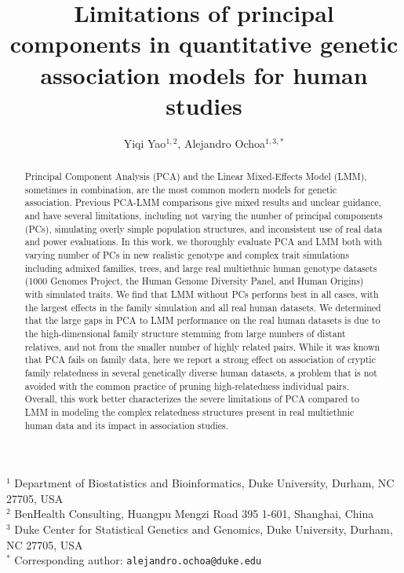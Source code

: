 \documentclass[11pt]{article}
\title{\Large \textbf{
    Limitations of principal components in quantitative genetic association models for human studies
  }}
\author{Yiqi Yao$^{1,2}$, Alejandro Ochoa$^{1,3,*}$}
\date{}
\begin{document}
\maketitle

\noindent
$^1$ Department of Biostatistics and Bioinformatics, Duke University, Durham, NC 27705, USA \\
$^2$ BenHealth Consulting, Huangpu Mengzi Road 395 1-601, Shanghai, China \\
$^3$ Duke Center for Statistical Genetics and Genomics, Duke University, Durham, NC 27705, USA \\
$^*$ Corresponding author: \texttt{alejandro.ochoa@duke.edu}

\begin{abstract}
  Principal Component Analysis (PCA) and the Linear Mixed-Effects Model (LMM), sometimes in combination, are the most common modern models for genetic association.
  Previous PCA-LMM comparisons give mixed results and unclear guidance, and have several limitations, including not varying the number of principal components (PCs), simulating overly simple population structures, and inconsistent use of real data and power evaluations.
  In this work, we thoroughly evaluate PCA and LMM both with varying number of PCs in new realistic genotype and complex trait simulations including admixed families, trees, and large real multiethnic human genotype datasets (1000 Genomes Project, the Human Genome Diversity Panel, and Human Origins) with simulated traits.
  We find that LMM without PCs performs best in all cases, with the largest effects in the family simulation and all real human datasets.
  We determined that the large gaps in PCA to LMM performance on the real human datasets is due to the high-dimensional family structure stemming from large numbers of distant relatives, and not from the smaller number of highly related pairs.
  While it was known that PCA fails on family data, here we report a strong effect on association of cryptic family relatedness in several genetically diverse human datasets, a problem that is not avoided with the common practice of pruning high-relatedness individual pairs.
  Overall, this work better characterizes the severe limitations of PCA compared to LMM in modeling the complex relatedness structures present in real multiethnic human data and its impact in association studies.
\end{abstract}

\end{document}
